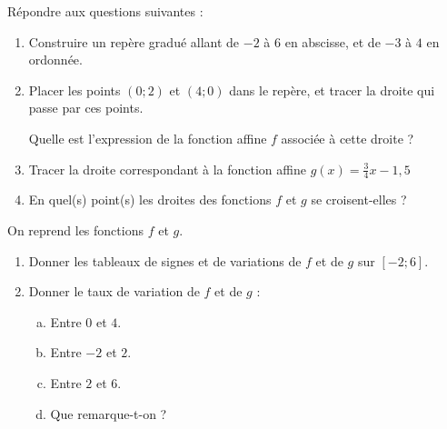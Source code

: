 \documentclass{beamer}
\begin{document}
\begin{frame}
	Répondre aux questions suivantes :
	\begin{enumerate}
		\item Construire un repère gradué allant de $-2$ à $6$ en abscisse, et de $-3$ à $4$ en ordonnée.
		\item Placer les points $(0 ; 2)$ et $(4 ; 0)$ dans le repère, et tracer la droite qui passe par ces points.

		      Quelle est l'expression de la fonction affine $f$ associée à cette droite ?
		\item Tracer la droite correspondant à la fonction affine $g(x) = \frac{3}{4}x - 1,5$
		\item En quel(s) point(s) les droites des fonctions $f$ et $g$ se croisent-elles ?
	\end{enumerate}
\end{frame}

\begin{frame}
	On reprend les fonctions $f$ et $g$.

	\begin{enumerate}
		\item Donner les tableaux de signes et de variations de $f$ et de $g$ sur $[-2 ; 6]$.
		\item Donner le taux de variation de $f$ et de $g$ :
		      \begin{enumerate}[a.]
			      \item Entre $0$ et $4$.
			      \item Entre $-2$ et $2$.
			      \item Entre $2$ et $6$.
			      \item Que remarque-t-on ?
		      \end{enumerate}
	\end{enumerate}
\end{frame}

\begin{frame}
	\begin{center}
	\end{center}
\end{frame}
\end{document}
